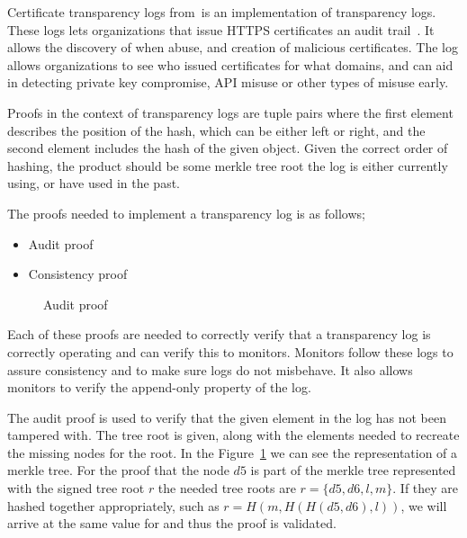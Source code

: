 \documentclass[../Main/thesis.tex]{subfiles}
\begin{document}
Certificate transparency logs
from~\citeauthor{b.-laurie-a.-langley-e.kaster-google-2013}is an implementation
of transparency logs. These logs lets organizations that issue HTTPS
certificates an audit trail~\cite{b.-laurie-a.-langley-e.kaster-google-2013}.
It allows the discovery of when abuse, and creation of malicious certificates.
The log allows organizations to see who issued certificates for what domains,
and can aid in detecting private key compromise, API misuse or other types of
misuse early.

Proofs in the context of transparency logs are tuple pairs where the first
element describes the position of the hash, which can be either left or right,
and the second element includes the hash of the given object. Given the correct
order of hashing, the product should be some merkle tree root the log is either
currently using, or have used in the past.

The proofs needed to implement a transparency log is as follows;
\begin{itemize}
\item Audit proof
\item Consistency proof
\end{itemize}

\begin{figure}[H]
\centering
{}%
\qquad
{}%
\caption{Audit proof}
\label{fig:audit}
\end{figure}

Each of these proofs are needed to correctly verify that a transparency log
is correctly operating and can verify this to monitors.  Monitors follow
these logs to assure consistency and to make sure logs do not misbehave. It
also allows monitors to verify the append-only property of the log.

The audit proof is used to verify that the given element in the log has not been
tampered with. The tree root is given, along with the elements needed to
recreate the missing nodes for the root. In the Figure~\ref{fig:audit} we can
see the representation of a merkle tree. For the proof that the node $ d5 $ is
part of the merkle tree represented with the signed tree root $ r $ the needed
tree roots are $ r = \{ d5, d6, l, m \} $. If they are hashed together
appropriately, such as $ r = H( m, H( H(d5, d6), l)) $, we will arrive at the
same value for and thus the proof is validated.
\end{document}
